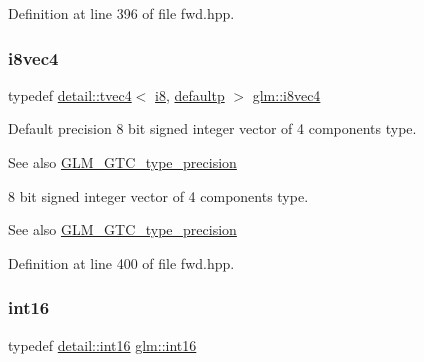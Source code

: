 Definition at line 396 of file fwd.\+hpp.

\mbox{\label{group__gtc__type__precision_ga89bb5e6481ae11fb2599b71e36a390bb}} 
\subsubsection{\texorpdfstring{i8vec4}{i8vec4}}
{\footnotesize\ttfamily typedef \hyperlink{structglm_1_1detail_1_1tvec4}{detail\+::tvec4}$<$ \hyperlink{group__gtc__type__precision_gaae064be68b7d36cd7910c16e8ad18bba}{i8}, \hyperlink{namespaceglm_a0f04f086094c747d227af4425893f545a9d21ccd8b5a009ec7eb7677befc3bf51}{defaultp} $>$ \hyperlink{group__gtc__type__precision_ga89bb5e6481ae11fb2599b71e36a390bb}{glm\+::i8vec4}}

Default precision 8 bit signed integer vector of 4 components type. \begin{DoxySeeAlso}{See also}
\hyperlink{group__gtc__type__precision}{G\+L\+M\+\_\+\+G\+T\+C\+\_\+type\+\_\+precision}
\end{DoxySeeAlso}
8 bit signed integer vector of 4 components type. \begin{DoxySeeAlso}{See also}
\hyperlink{group__gtc__type__precision}{G\+L\+M\+\_\+\+G\+T\+C\+\_\+type\+\_\+precision} 
\end{DoxySeeAlso}


Definition at line 400 of file fwd.\+hpp.

\mbox{\label{group__gtc__type__precision_ga2945a61d12771f8954994fcddf02b021}} 
\subsubsection{\texorpdfstring{int16}{int16}}
{\footnotesize\ttfamily typedef \hyperlink{namespaceglm_1_1detail_a375938874ca4f0a0982ec6373b56117b}{detail\+::int16} \hyperlink{group__gtc__type__precision_ga2945a61d12771f8954994fcddf02b021}{glm\+::int16}}

